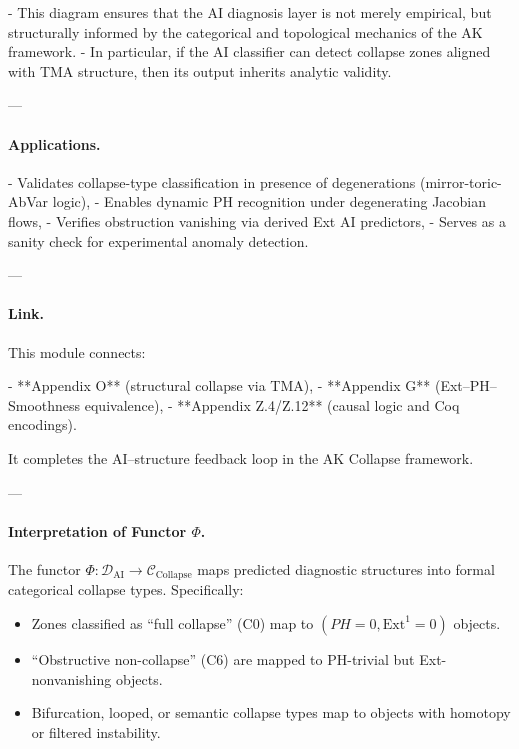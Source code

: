 \documentclass[11pt]{article}
\begin{document}
\begin{axiom}
\begin{axiom}
{{- This diagram ensures that the AI diagnosis layer is not merely empirical, but structurally informed by  
the categorical and topological mechanics of the AK framework.
- In particular, if the AI classifier can detect collapse zones aligned with TMA structure,  
then its output inherits analytic validity.

---

\paragraph{Applications.}

- Validates collapse-type classification in presence of degenerations (mirror-toric-AbVar logic),
- Enables dynamic PH recognition under degenerating Jacobian flows,
- Verifies obstruction vanishing via derived Ext AI predictors,
- Serves as a sanity check for experimental anomaly detection.

---

\paragraph{Link.}  
This module connects:

- **Appendix O** (structural collapse via TMA),
- **Appendix G** (Ext–PH–Smoothness equivalence),
- **Appendix Z.4/Z.12** (causal logic and Coq encodings).

It completes the AI–structure feedback loop in the AK Collapse framework.


---

\paragraph{Interpretation of Functor $\Phi$.}

The functor $\Phi : \mathcal{D}_{\text{AI}} \to \mathcal{C}_{\text{Collapse}}$ maps predicted diagnostic structures  
into formal categorical collapse types. Specifically:

\begin{itemize}
  \item Zones classified as “full collapse” (C0) map to $(PH=0, \mathrm{Ext}^1 = 0)$ objects.
  \item “Obstructive non-collapse” (C6) are mapped to PH-trivial but Ext-nonvanishing objects.
  \item Bifurcation, looped, or semantic collapse types map to objects with homotopy or filtered instability.
\end{itemize}

}}
\end{axiom}
\end{axiom}
\end{document}
